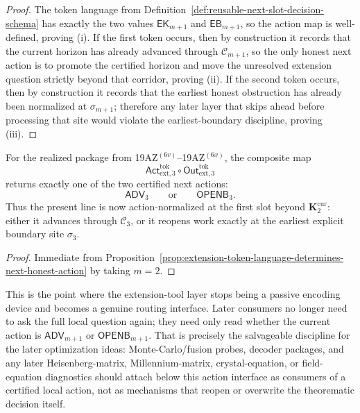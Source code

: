 \begin{proof}
The token language from Definition~\ref{def:reusable-next-slot-decision-schema} has exactly the two values \(\mathsf{EK}_{m+1}\) and \(\mathsf{EB}_{m+1}\), so the action map is well-defined, proving (i). If the first token occurs, then by construction it records that the current horizon has already advanced through \(\mathcal C_{m+1}\), so the only honest next action is to promote the certified horizon and move the unresolved extension question strictly beyond that corridor, proving (ii). If the second token occurs, then by construction it records that the earliest honest obstruction has already been normalized at \(\sigma_{m+1}\); therefore any later layer that skips ahead before processing that site would violate the earliest-boundary discipline, proving (iii).
\end{proof}

\begin{corollary}
\label{cor:sigma3-token-package-now-induces-certified-next-action-split}
For the realized package from 19AZ$^{(6v)}$--19AZ$^{(6x)}$, the composite map
\[
 \mathsf{Act}^{\mathrm{tok}}_{\mathrm{ext},3}\circ \mathsf{Out}^{\mathrm{tok}}_{\mathrm{ext},3}
\]
returns exactly one of the two certified next actions:
\[
 \mathsf{ADV}_3
 \qquad\text{or}\qquad
 \mathsf{OPENB}_3.
\]
Thus the present line is now action-normalized at the first slot beyond \(\mathbf K_2^{\mathrm{cur}}\): either it advances through \(\mathcal C_3\), or it reopens work exactly at the earliest explicit boundary site \(\sigma_3\).
\end{corollary}

\begin{proof}
Immediate from Proposition~\ref{prop:extension-token-language-determines-next-honest-action} by taking \(m=2\).
\end{proof}

\begin{remark}
\label{rem:what-this-action-map-now-buys-and-what-can-be-salvaged-into-later-layers}
This is the point where the extension-tool layer stops being a passive encoding device and becomes a genuine routing interface. Later consumers no longer need to ask the full local question again; they need only read whether the current action is \(\mathsf{ADV}_{m+1}\) or \(\mathsf{OPENB}_{m+1}\). That is precisely the salvageable discipline for the later optimization ideas: Monte-Carlo/fusion probes, decoder packages, and any later Heisenberg-matrix, Millennium-matrix, crystal-equation, or field-equation diagnostics should attach below this action interface as consumers of a certified local action, not as mechanisms that reopen or overwrite the theorematic decision itself.
\end{remark}


